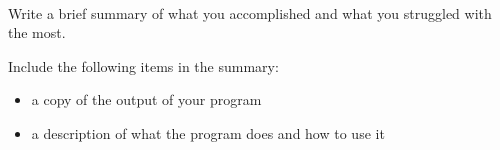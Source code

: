 \documentclass[12pt]{article}
\begin{document}
\begin{description}[labelindent=1cm]
\begin{enumerate}
	\end{enumerate}

\newpage
\item[\textbf{\underline{Solution Code:}}] \hfill \vspace{0mm}
%
%
%
%

\newpage
\item[\textbf{\underline{Tutorial Summary:}}] \hfill \vspace{3mm}\\ 
Write a brief summary of what you accomplished and what you struggled with the most. 

Include the following items in the summary:
\begin{itemize}

\item a copy of the output of your program
\item a description of what the program does and how to use it

\end{itemize}


%
%
%
%
%


\end{description}
\end{document}
